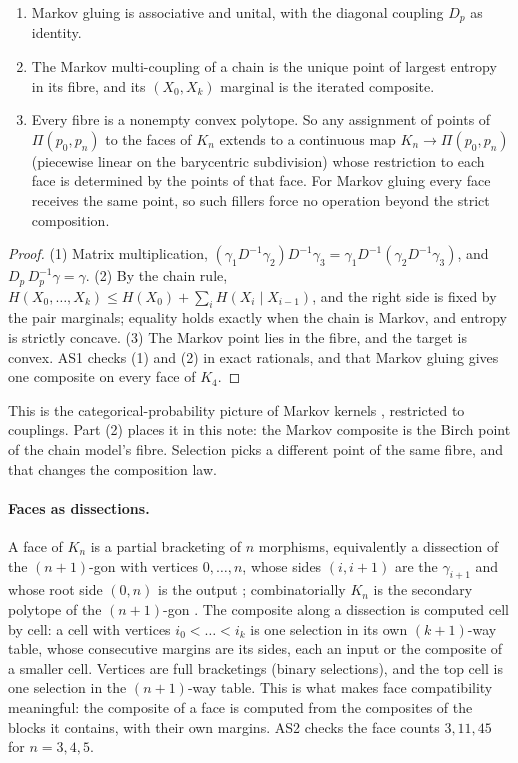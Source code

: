 \documentclass[11pt]{article}
\theoremstyle{definition}\newtheorem{definition}[theorem]{Definition}\newtheorem{remark}[theorem]{Remark}\newtheorem{example}[theorem]{Example}\newtheorem{problem}[theorem]{Open problem}\crefname{problem}{Problem}{Problems}
\begin{document}
\begin{proposition}\label{prop:markovglue}
\begin{enumerate}
\item[(1)] Markov gluing is associative and unital, with the diagonal coupling $D_p$ as identity.
\item[(2)] The Markov multi-coupling of a chain is the unique point of largest entropy in its fibre, and its $(X_0,X_k)$ marginal is the iterated composite.
\item[(3)] Every fibre is a nonempty convex polytope. So any assignment of points of $\Pi(p_0,p_n)$ to the faces of $K_n$ extends to a continuous map $K_n\to\Pi(p_0,p_n)$ (piecewise linear on the barycentric
subdivision) whose restriction to each face is determined by the points of that face. For Markov gluing every face receives the same point, so such fillers force no operation beyond the strict
composition.
\end{enumerate}
\end{proposition}

\begin{proof}
(1) Matrix multiplication, $(\gamma_1D^{-1}\gamma_2)D^{-1}\gamma_3=\gamma_1D^{-1}(\gamma_2D^{-1}\gamma_3)$, and $D_p\,D_p^{-1}\gamma=\gamma$. (2) By the chain rule, $H(X_0,\dots,X_k)\le H(X_0)+\sum_iH(X_i\mid X_{i-1})$, and the
right side is fixed by the pair marginals; equality holds exactly when the chain is Markov, and entropy is strictly concave. (3) The Markov point lies in the fibre, and the target is convex. AS1 checks
(1) and (2) in exact rationals, and that Markov gluing gives one composite on every face of $K_4$.
\end{proof}

This is the categorical-probability picture of Markov kernels \cite{Fritz2020}, restricted to couplings. Part (2) places it in this note: the Markov composite is the Birch point of the chain model's
fibre. Selection picks a different point of the same fibre, and that changes the composition law.

\paragraph{Faces as dissections.} A face of $K_n$ is a partial bracketing of $n$ morphisms, equivalently a dissection of the $(n+1)$-gon with vertices $0,\dots,n$, whose sides $(i,i+1)$ are the
$\gamma_{i+1}$ and whose root side $(0,n)$ is the output \cite{Stasheff1963}; combinatorially $K_n$ is the secondary polytope of the $(n+1)$-gon \cite{GKZ1994}. The composite along a dissection is
computed cell by cell: a cell with vertices $i_0<\dots<i_k$ is one selection in its own $(k+1)$-way table, whose consecutive margins are its sides, each an input or the composite of a smaller cell.
Vertices are full bracketings (binary selections), and the top cell is one selection in the $(n+1)$-way table. This is what makes face compatibility meaningful: the composite of a face is computed
from the composites of the blocks it contains, with their own margins. AS2 checks the face counts $3,11,45$ for $n=3,4,5$.
\end{document}
